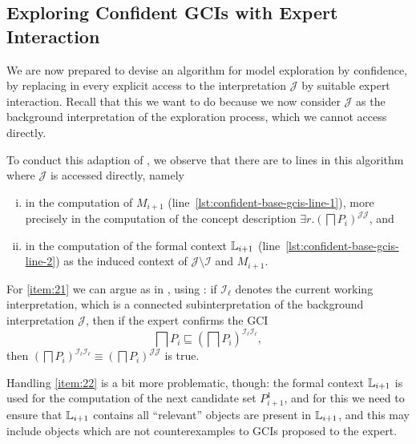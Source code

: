 \subsection{Exploring Confident GCIs with Expert Interaction}
\label{sec:expl-conf-gcis-1}

We are now prepared to devise an algorithm for model exploration by confidence, by
replacing in  every explicit access to the
interpretation $\mathcal{J}$ by suitable expert interaction.  Recall that this we want to
do because we now consider $\mathcal{J}$ as the background interpretation of the
exploration process, which we cannot access directly.

To conduct this adaption of , we observe
that there are to lines in this algorithm where $\mathcal{J}$ is accessed directly, namely
\begin{enumerate}[i. ]
\item\label{item:21} in the computation of $M_{i+1}$
  (line~\ref{lst:confident-base-gcis-line-1}), more precisely in the computation of the
  concept description $\exists r.(\bigsqcap P_{i})^{\mathcal{J}\mathcal{J}}$, and
\item\label{item:22} in the computation of the formal context ${\mathbb{L}}_{i+1}$
  (line~\ref{lst:confident-base-gcis-line-2}) as the induced context of $\mathcal{J}
  \setminus \mathcal{I}$ and $M_{i+1}$.
\end{enumerate}

For \cref{item:21} we can argue as in , using
: if $\mathcal{I}_{\ell}$ denotes the current working interpretation,
which is a connected subinterpretation of the background interpretation $\mathcal{J}$,
then if the expert confirms the GCI
\begin{equation*}
  \bigsqcap P_{i} \sqsubseteq (\bigsqcap P_{i})^{\mathcal{I}_{\ell}\mathcal{I}_{\ell}},
\end{equation*}
then $(\bigsqcap P_{i})^{\mathcal{I}_{\ell}\mathcal{I}_{\ell}} \equiv (\bigsqcap
P_{i})^{\mathcal{J}\mathcal{J}}$ is true.

Handling \cref{item:22} is a bit more problematic, though: the formal context ${\mathbb{L}}_{i+1}$ is used for the computation of the next candidate set $P_{i+1}^{1}$, and for this
we need to ensure that ${\mathbb{L}}_{i+1}$ contains all ``relevant'' objects are present in
${\mathbb{L}}_{i+1}$, and this may include objects which are not counterexamples to GCIs
proposed to the expert.

